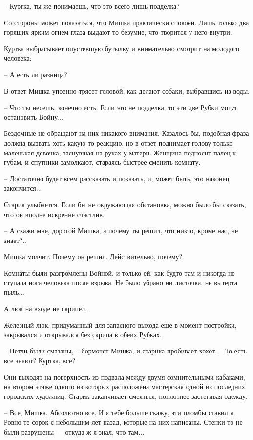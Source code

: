 \documentclass[a5paper]{article}
\begin{document}
-- Куртка, ты же понимаешь, что это всего лишь подделка?

Со стороны может показаться, что Мишка практически спокоен. Лишь только два горящих ярким огнем глаза выдают то безумие, что творится у него внутри.

Куртка выбрасывает опустевшую бутылку и внимательно смотрит на молодого человека:

-- А есть ли разница?

В ответ Мишка упоенно трясет головой, как делают собаки, выбравшись из воды.

-- Что ты несешь, конечно есть. Если это не подделка, то эти две Рубки могут остановить Войну...

Бездомные не обращают на них никакого внимания. Казалось бы, подобная фраза должна вызвать хоть какую-то реакцию, но в ответ поднимает голову только маленькая девочка, заснувшая на руках у матери. Женщина подносит палец к губам, и спутники замолкают, стараясь быстрее сменить комнату.

-- Достаточно будет всем рассказать и показать, и, может быть, это наконец закончится...

Старик улыбается. Если бы не окружающая обстановка, можно было бы сказать, что он вполне искренне счастлив.

-- А скажи мне, дорогой Мишка, а почему ты решил, что никто, кроме нас, не знает?..

Мишка молчит. Почему он решил. Действительно, почему?

Комнаты были разгромлены Войной, и только ей, как будто там и никогда не ступала нога человека после взрыва. Не было убрано ни листочка, не вытерта пыль...

А люк на входе не скрипел.

Железный люк, придуманный для запасного выхода еще в момент постройки, закрывался и открывался без скрипа в обеих Рубках.

-- Петли были смазаны, -- бормочет Мишка, и старика пробивает хохот. -- То есть все знают? Куртка, все?

Они выходят на поверхность из подвала между двумя сомнительными кабаками, на втором этаже одного из которых расположена мастерская одной из последних городских художниц. Старик заканчивает смеяться, поплотнее застегивая одежду.

-- Все, Мишка. Абсолютно все. И я тебе больше скажу, эти пломбы ставил я. Ровно те сорок с небольшим лет назад, которые на них написаны. Стенки-то не были разрушены --- откуда ж я знал, что там...
\end{document}

